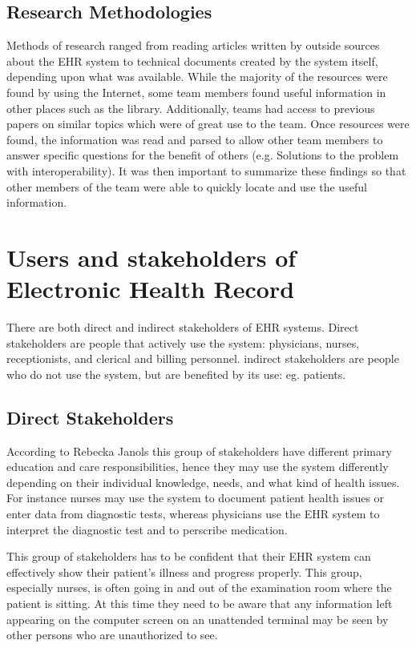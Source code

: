 \documentclass[14pt]{article}
\begin{document}
\subsection{Research Methodologies }
Methods of research ranged from reading articles written by outside sources about the \gls{EHR} system to technical documents created by the system itself, depending upon what was available.  While the majority of the resources were found by using the Internet, some team members found useful information in other places such as the library.  Additionally, teams had access to previous papers on similar topics which were of great use to the team.  Once resources were found, the information was read and parsed to allow other team members to answer specific questions for the benefit of others (e.g. Solutions to the problem with interoperability).  It was then important to summarize these findings so that other members of the team were able to quickly locate and use the useful information.

\newpage

\section{Users and stakeholders of Electronic Health Record}
\label{sec:People}
There are both direct and indirect stakeholders of \gls{EHR} systems. Direct stakeholders are people that actively use the system: physicians, nurses, receptionists, and clerical and billing personnel. indirect stakeholders are people who do not use the system, but are benefited by its use: eg. patients.

\subsection{Direct Stakeholders}
\label{sec:peopleDirect}
According to Rebecka Janols \cite{Janols} this group of stakeholders have different primary education and care responsibilities, hence they may use the system differently depending on their individual knowledge, needs, and what kind of health issues. For instance nurses may use the system to document patient health issues or enter data from diagnostic tests, whereas physicians use the \gls{EHR} system to interpret the diagnostic test and to perscribe medication. 

This group of stakeholders has to be confident that their \gls{EHR} system can effectively show their patient’s illness and progress properly. This group, especially nurses, is often going in and out of the examination room where the patient is sitting. At this time they need to be aware that any information left appearing on the computer screen on an unattended terminal may be seen by other persons who are unauthorized to see. 
\end{document}

